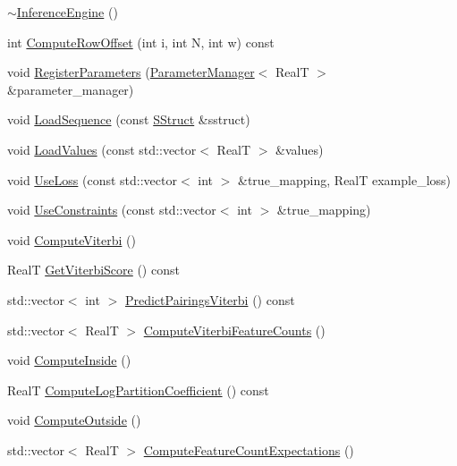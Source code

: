 \begin{DoxyCompactItemize}
\hyperlink{class_inference_engine_ab79efe41385aeef2e1703dc9335a4941}{$\sim$\+Inference\+Engine} ()
\item 
int \hyperlink{class_inference_engine_af76662221c72e5cbe17d9432fda80e03}{Compute\+Row\+Offset} (int i, int N, int w) const 
\item 
void \hyperlink{class_inference_engine_a5f4b92138aaa9a45fcc045f818286bd8}{Register\+Parameters} (\hyperlink{class_parameter_manager}{Parameter\+Manager}$<$ Real\+T $>$ \&parameter\+\_\+manager)
\item 
void \hyperlink{class_inference_engine_a092dc8818603fbc358e2226f3e743d62}{Load\+Sequence} (const \hyperlink{class_s_struct}{S\+Struct} \&sstruct)
\item 
void \hyperlink{class_inference_engine_abd2764fab807200098b69141b0d1eaca}{Load\+Values} (const std\+::vector$<$ Real\+T $>$ \&values)
\item 
void \hyperlink{class_inference_engine_a1c4ff1f7f65a76fa1111ef554ae17ed2}{Use\+Loss} (const std\+::vector$<$ int $>$ \&true\+\_\+mapping, Real\+T example\+\_\+loss)
\item 
void \hyperlink{class_inference_engine_a6a1c5eeb8bfb91e8562d9e937c7c46aa}{Use\+Constraints} (const std\+::vector$<$ int $>$ \&true\+\_\+mapping)
\item 
void \hyperlink{class_inference_engine_ad31521433bc7ca8747f42313571dca0d}{Compute\+Viterbi} ()
\item 
Real\+T \hyperlink{class_inference_engine_a12a4e655e8f06f81a06564f8f81499dc}{Get\+Viterbi\+Score} () const 
\item 
std\+::vector$<$ int $>$ \hyperlink{class_inference_engine_a8fc558a64e5896672b6d2a3ad94e3d92}{Predict\+Pairings\+Viterbi} () const 
\item 
std\+::vector$<$ Real\+T $>$ \hyperlink{class_inference_engine_a10481c5b1496d8bbb5a6703711a8b5ef}{Compute\+Viterbi\+Feature\+Counts} ()
\item 
void \hyperlink{class_inference_engine_ad76e23c8323b050b23e8c1c7e8046f0e}{Compute\+Inside} ()
\item 
Real\+T \hyperlink{class_inference_engine_a2e11e84d4854b492fc3ab4eda0c7aa84}{Compute\+Log\+Partition\+Coefficient} () const 
\item 
void \hyperlink{class_inference_engine_a2d0abf6db99cfd61b703d8e567bee09d}{Compute\+Outside} ()
\item 
std\+::vector$<$ Real\+T $>$ \hyperlink{class_inference_engine_a96c95e8a56ce6048ddf2f148f2b45c65}{Compute\+Feature\+Count\+Expectations} ()
\item 

\end{DoxyCompactItemize}

